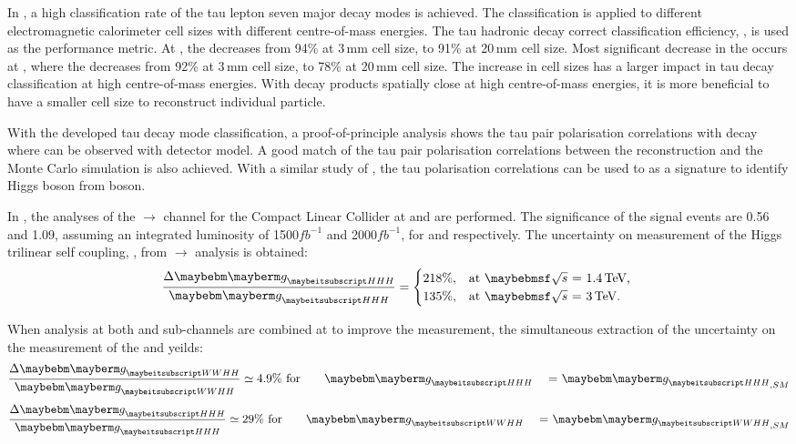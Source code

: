 In , a high classification rate of the tau lepton seven major decay modes is achieved. The classification is applied to different electromagnetic calorimeter cell sizes with different centre-of-mass energies. The tau hadronic decay correct classification efficiency, \tauHad,  is used as the performance metric. At , the \tauHad decreases from 94\% at 3\,mm cell size, to 91\% at 20\,mm cell size. Most significant decrease in the \tauHad occurs at  , where the \tauHad decreases from 92\% at 3\,mm cell size, to 78\% at 20\,mm cell size.
The increase in \ECAL cell sizes has a larger impact in tau decay classification at high centre-of-mass energies. With decay products spatially close at high centre-of-mass energies, it is more beneficial to have a smaller \ECAL cell size to reconstruct individual particle.

With the developed tau decay mode classification, a proof-of-principle analysis shows the tau pair polarisation correlations with \ZToTauTau decay where \tauToPion can be observed with \ILD detector model. A good match of the tau pair polarisation correlations between the reconstruction and the Monte Carlo simulation is also achieved.   With a similar study of \HiggsToTauTau,  the tau polarisation correlations can be used to as a signature to identify  Higgs boson from \PZ boson.




 In , the analyses of the \eeToHH $\to$ \HepProcess{ \Pbottom \APbottom \PWplus \PWminus \Pnue \APnue} channel for the Compact Linear Collider at  and  are performed. The significance of the signal events are 0.56 and 1.09,  assuming an integrated luminosity of 1500$fb^{-1}$ and 2000$fb^{-1}$, for   and  respectively.  The uncertainty on measurement of the Higgs trilinear self coupling, \gHHH, from  \eeToHH $\to$ \HepProcess{ \Pbottom \APbottom \PWplus \PWminus \Pnue \APnue} analysis is obtained:
\begin{equation}
\frac{\Delta\gHHH}{\gHHH}=
\begin{cases}
  218\%, & \mbox{at \rootS{1.4}, }  \\
  135\%, & \mbox{at \rootS{3}}.
\end{cases}
\end{equation}

When analysis at both \eeToHHbbWW and \eeToHHbbbb sub-channels are combined at  to improve the measurement, the simultaneous extraction of the uncertainty on the measurement of the \gHHH and \gWWHH yeilds:
\begin{equation}
\frac{\Delta\gWWHH}{\gWWHH} \simeq 4.9\% \text{ for \gHHH = $\gHHH_{,SM}$}
\end{equation}
\begin{equation}
\frac{\Delta\gHHH}{\gHHH} \simeq 29\% \text{ for \gWWHH = $\gWWHH_{,SM}$}
\end{equation}
